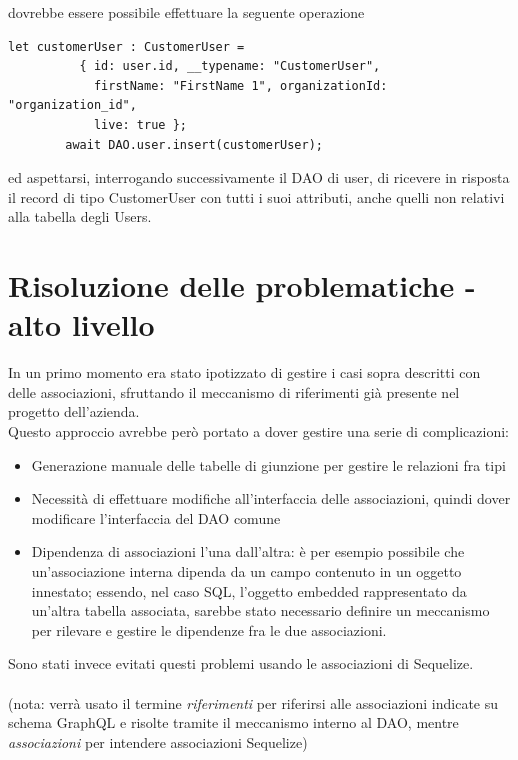 \documentclass[a4paper, 12pt]{report}
\begin{document}
      dovrebbe essere possibile effettuare la seguente operazione

      \begin{Verbatim}[samepage=true]
        let customerUser : CustomerUser = 
          { id: user.id, __typename: "CustomerUser",
            firstName: "FirstName 1", organizationId: "organization_id",
            live: true };
        await DAO.user.insert(customerUser);
      \end{Verbatim}

      ed aspettarsi, interrogando successivamente il DAO di user, di ricevere in risposta il record di tipo CustomerUser con tutti i suoi attributi, anche quelli non relativi alla tabella degli Users.

    \newpage
    \section{Risoluzione delle problematiche - alto livello}
      In un primo momento era stato ipotizzato di gestire i casi sopra descritti con delle associazioni, sfruttando il meccanismo di riferimenti già presente nel progetto dell'azienda.\\
      Questo approccio avrebbe però portato a dover gestire una serie di complicazioni:
      \begin{itemize}
        \item Generazione manuale delle tabelle di giunzione per gestire le relazioni fra tipi
        \item Necessità di effettuare modifiche all'interfaccia delle associazioni, quindi dover modificare l'interfaccia del DAO comune
        \item Dipendenza di associazioni l'una dall'altra: è per esempio possibile che un'associazione interna dipenda da un campo contenuto in un oggetto innestato; essendo, nel caso SQL, l'oggetto embedded rappresentato da un'altra tabella associata, sarebbe stato necessario definire un meccanismo per rilevare e gestire le dipendenze fra le due associazioni.
      \end{itemize}
      Sono stati invece evitati questi problemi usando le associazioni di Sequelize.
      \paragraph*{}
      (nota: verrà usato il termine \emph{riferimenti} per riferirsi alle associazioni indicate su schema GraphQL e risolte tramite il meccanismo interno al DAO, mentre \emph{associazioni} per intendere associazioni Sequelize)
\end{document}
